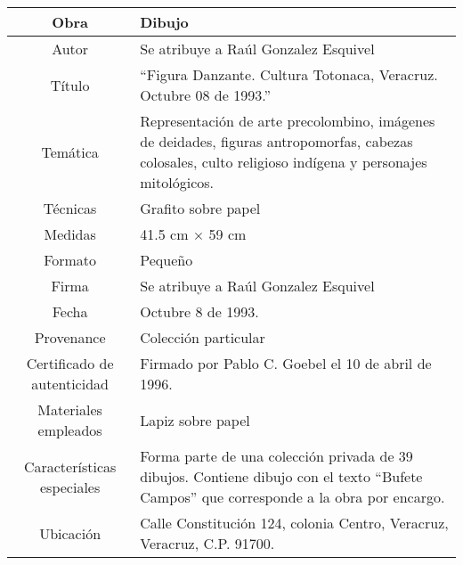 \begin{table}[H]
\centering
\begin{tabular}{|c|m{}|}
\hline
Obra& Dibujo	\\
\hline
Autor & Se atribuye a Ra\'ul Gonzalez Esquivel\\
\hline
T\'itulo & ``Figura Danzante. Cultura Totonaca, Veracruz. Octubre 08 de 1993.''\\
\hline
Tem\'atica & Representaci\'on de arte precolombino, im\'agenes de deidades, figuras antropomorfas, cabezas colosales, culto religioso ind\'igena y personajes mitol\'ogicos.\\
\hline
T\'ecnicas &Grafito sobre papel \\
\hline
Medidas & 41.5 cm $\times$ 59 cm \\
\hline
 Formato & Peque\~no \\
 \hline
 Firma & Se atribuye a Ra\'ul Gonzalez Esquivel\\ 
 \hline
  Fecha & Octubre 8 de 1993.\\
 \hline
 Provenance & Colecci\'on particular\\
 \hline
 Certificado de autenticidad& Firmado por Pablo C. Goebel el 10 de abril de 1996.  \\
 \hline 
  Materiales empleados & Lapiz sobre papel\\
 \hline
 Caracter\'isticas especiales & Forma parte de una colecci\'on privada de 39 dibujos. 
Contiene dibujo con el texto ``Bufete Campos'' que corresponde a la obra por encargo. \\
\hline 
Ubicaci\'on & Calle Constituci\'on 124, colonia Centro, Veracruz, Veracruz, C.P. 91700.\\
\hline

\end{tabular}
\end{table}

